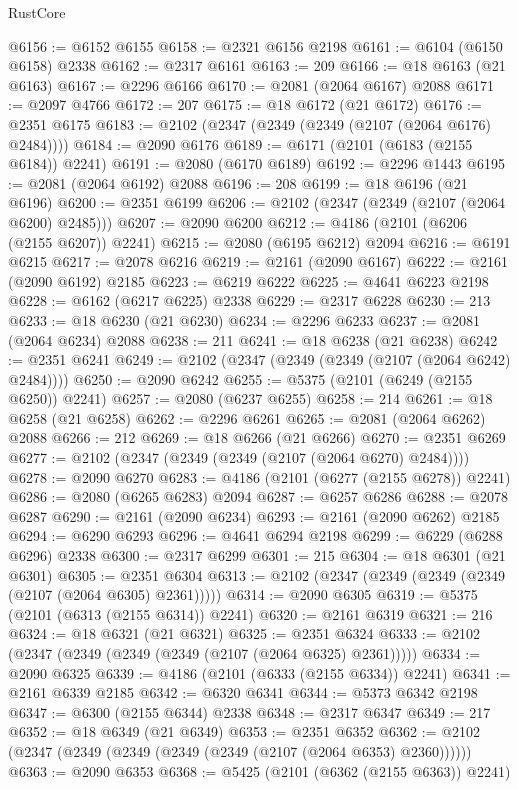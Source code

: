 \begin{lexlean}{RustCore}
\begin{coremodule}
@6156 := @6152 @6155
@6158 := @2321 @6156 @2198
@6161 := @6104 (@6150 @6158) @2338
@6162 := @2317 @6161
@6163 := 209
@6166 := @18 @6163 (@21 @6163)
@6167 := @2296 @6166
@6170 := @2081 (@2064 @6167) @2088
@6171 := @2097 @4766
@6172 := 207
@6175 := @18 @6172 (@21 @6172)
@6176 := @2351 @6175
@6183 := @2102 (@2347 (@2349 (@2349 (@2107 (@2064 @6176) @2484))))
@6184 := @2090 @6176
@6189 := @6171 (@2101 (@6183 (@2155 @6184)) @2241)
@6191 := @2080 (@6170 @6189)
@6192 := @2296 @1443
@6195 := @2081 (@2064 @6192) @2088
@6196 := 208
@6199 := @18 @6196 (@21 @6196)
@6200 := @2351 @6199
@6206 := @2102 (@2347 (@2349 (@2107 (@2064 @6200) @2485)))
@6207 := @2090 @6200
@6212 := @4186 (@2101 (@6206 (@2155 @6207)) @2241)
@6215 := @2080 (@6195 @6212) @2094
@6216 := @6191 @6215
@6217 := @2078 @6216
@6219 := @2161 (@2090 @6167)
@6222 := @2161 (@2090 @6192) @2185
@6223 := @6219 @6222
@6225 := @4641 @6223 @2198
@6228 := @6162 (@6217 @6225) @2338
@6229 := @2317 @6228
@6230 := 213
@6233 := @18 @6230 (@21 @6230)
@6234 := @2296 @6233
@6237 := @2081 (@2064 @6234) @2088
@6238 := 211
@6241 := @18 @6238 (@21 @6238)
@6242 := @2351 @6241
@6249 := @2102 (@2347 (@2349 (@2349 (@2107 (@2064 @6242) @2484))))
@6250 := @2090 @6242
@6255 := @5375 (@2101 (@6249 (@2155 @6250)) @2241)
@6257 := @2080 (@6237 @6255)
@6258 := 214
@6261 := @18 @6258 (@21 @6258)
@6262 := @2296 @6261
@6265 := @2081 (@2064 @6262) @2088
@6266 := 212
@6269 := @18 @6266 (@21 @6266)
@6270 := @2351 @6269
@6277 := @2102 (@2347 (@2349 (@2349 (@2107 (@2064 @6270) @2484))))
@6278 := @2090 @6270
@6283 := @4186 (@2101 (@6277 (@2155 @6278)) @2241)
@6286 := @2080 (@6265 @6283) @2094
@6287 := @6257 @6286
@6288 := @2078 @6287
@6290 := @2161 (@2090 @6234)
@6293 := @2161 (@2090 @6262) @2185
@6294 := @6290 @6293
@6296 := @4641 @6294 @2198
@6299 := @6229 (@6288 @6296) @2338
@6300 := @2317 @6299
@6301 := 215
@6304 := @18 @6301 (@21 @6301)
@6305 := @2351 @6304
@6313 := @2102 (@2347 (@2349 (@2349 (@2349 (@2107 (@2064 @6305) @2361)))))
@6314 := @2090 @6305
@6319 := @5375 (@2101 (@6313 (@2155 @6314)) @2241)
@6320 := @2161 @6319
@6321 := 216
@6324 := @18 @6321 (@21 @6321)
@6325 := @2351 @6324
@6333 := @2102 (@2347 (@2349 (@2349 (@2349 (@2107 (@2064 @6325) @2361)))))
@6334 := @2090 @6325
@6339 := @4186 (@2101 (@6333 (@2155 @6334)) @2241)
@6341 := @2161 @6339 @2185
@6342 := @6320 @6341
@6344 := @5373 @6342 @2198
@6347 := @6300 (@2155 @6344) @2338
@6348 := @2317 @6347
@6349 := 217
@6352 := @18 @6349 (@21 @6349)
@6353 := @2351 @6352
@6362 := @2102 (@2347 (@2349 (@2349 (@2349 (@2349 (@2107 (@2064 @6353) @2360))))))
@6363 := @2090 @6353
@6368 := @5425 (@2101 (@6362 (@2155 @6363)) @2241)

\end{coremodule}
\end{lexlean}
